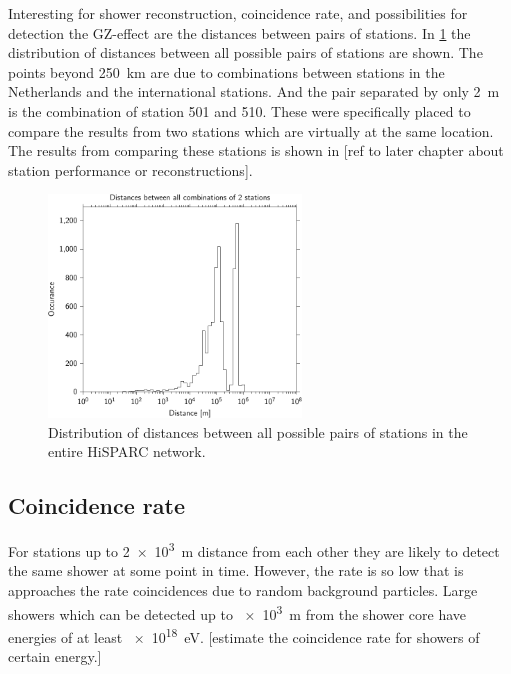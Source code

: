 Interesting for shower reconstruction, coincidence rate, and possibilities for detection the GZ-effect are the distances between pairs of stations. In \cref{fig:network_station_distances} the distribution of distances between all possible pairs of stations are shown. The points beyond \SI{250}{\kilo\meter} are due to combinations between stations in the Netherlands and the international stations. And the pair separated by only \SI{2}{\meter} is the combination of station 501 and 510. These were specifically placed to compare the results from two stations which are virtually at the same location. The results from comparing these stations is shown in [ref to later chapter about station performance or reconstructions].

\begin{figure}
    \centering
    \includegraphics[width=0.6\textwidth]
                    {plots/experiment/network_station_distances}
    \caption{Distribution of distances between all possible pairs of stations in the entire HiSPARC network.}
    \label{fig:network_station_distances}
\end{figure}

\subsection{Coincidence rate}

For stations up to \SI{2e3}{\meter} distance from each other they are likely to detect the same shower at some point in time. However, the rate is so low that is approaches the rate coincidences due to random background particles. Large showers which can be detected up to \SI{e3}{\meter} from the shower core have energies of at least \SI{e18}{\eV}. [estimate the coincidence rate for showers of certain energy.]

